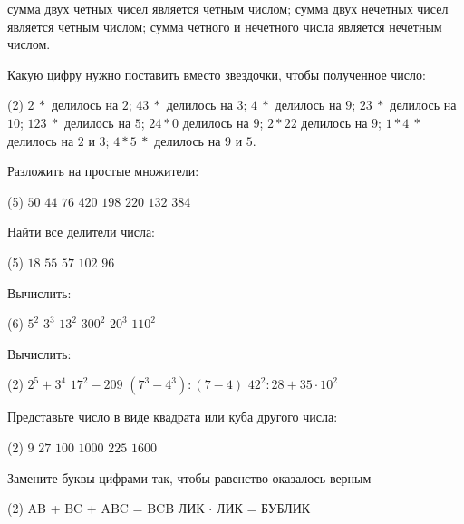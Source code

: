 \begin{class}[number=5]
\begin{listofex}
\begin{tasks}
		\task сумма двух четных чисел является четным числом;
		\task сумма двух нечетных чисел является четным числом;
		\task сумма четного и нечетного числа является нечетным числом.
	\end{tasks}
	\item Какую цифру нужно поставить вместо звездочки, чтобы полученное число:
	\begin{tasks}(2)
		\task \( 2\:* \) делилось на \( 2 \);
		\task \( 43\:* \) делилось на \( 3 \);
		\task \( 4\:* \) делилось на \( 9 \);
		\task \( 23\:* \) делилось на \( 10 \);
		\task \( 123\:* \) делилось на \( 5 \);
		\task \( 24*0 \) делилось на \( 9 \);
		\task \( 2*22 \) делилось на \( 9 \);
		\task \( 1*4\:* \) делилось на \( 2 \) и \( 3 \);
		\task \( 4*5\:* \) делилось на \( 9 \) и \( 5 \).
	\end{tasks}
	\end{listofex}
\end{class}

\begin{class}[number=6]
	\begin{listofex}
	\item Разложить на простые множители:
	\begin{tasks}(5)
		\task \( 50 \)
		\task \( 44 \)
		\task \( 76 \)
		\task \( 420 \)
		\task \( 198 \)
		\task \( 220 \)
		\task \( 132 \)
		\task \( 384 \)
	\end{tasks}
	\item Найти все делители числа:
	\begin{tasks}(5)
		\task \( 18 \)
		\task \( 55 \)
		\task \( 57 \)
		\task \( 102 \)
		\task \( 96 \)
	\end{tasks}
	\item Вычислить:
	\begin{tasks}(6)
		\task \( 5^2 \)
		\task \( 3^3 \)
		\task \( 13^2 \)
		\task \( 300^2 \)
		\task \( 20^3 \)
		\task \( 110^2 \)
	\end{tasks}
	\item Вычислить:
	\begin{tasks}(2)
		\task \( 2^5+3^4\)
		\task \( 17^2-209 \)
		\task \( (7^3-4^3):(7-4) \)
		\task \( 42^2:28+35\cdot10^2 \)
	\end{tasks}
	\item Представьте число в виде квадрата или куба другого числа:
	\begin{tasks}(2)
		\task \( 9 \)
		\task \( 27 \)
		\task \( 100 \)
		\task \( 1000 \)
		\task \( 225 \)
		\task \( 1600 \)
	\end{tasks}
	\item Замените буквы цифрами так, чтобы равенство оказалось верным
	\begin{tasks}(2)
		\task AB + BC + ABC = BCB
		\task ЛИК \( \cdot \) ЛИК = БУБЛИК
	\end{tasks}
	\end{listofex}
\end{class}

